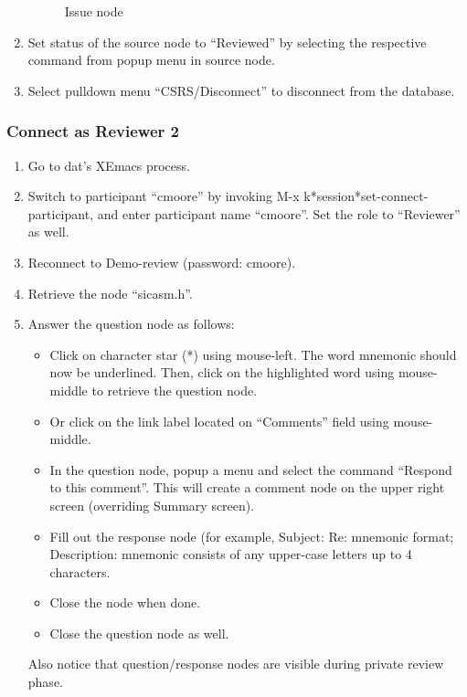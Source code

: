 \begin{enumerate}
\begin{figure}[htb]
  {\centerline{}}
  \caption{Issue node}
  \label{issue}
\end{figure}
   
\item Set status of the source node to ``Reviewed'' by selecting the
respective command from popup menu in source node.

\item Select pulldown menu ``CSRS/Disconnect'' to disconnect from the
database. 
\end{enumerate}

\subsubsection {Connect as Reviewer 2}
\begin{enumerate}
\item Go to dat's XEmacs process.
\item Switch to participant ``cmoore'' by invoking M-x
k*session*set-connect-participant, and enter participant name ``cmoore''.
Set the role to ``Reviewer'' as well.
\item Reconnect to Demo-review (password: cmoore).
\item Retrieve the node ``sicasm.h''.
\item Answer the question node as follows:
   \begin{itemize}
   \item Click on character star (*) using mouse-left. The word
   mnemonic should now be underlined. Then, click  on the highlighted
   word using mouse-middle to retrieve the question node. 
   \item Or click on the link label located on ``Comments'' field
   using mouse-middle. 
   \item In the question node, popup a menu and select the command
   ``Respond to this comment''. This will create a comment node on the
   upper right screen (overriding Summary screen).
   \item Fill out the response node (for example, Subject: Re:
   mnemonic format; Description:  mnemonic consists of any upper-case
   letters up to 4 characters.
   \item Close the node when done.
   \item Close the question node as well.
   \end{itemize}
   Also notice that question/response nodes are visible during private
   review phase. 

\end{enumerate}
